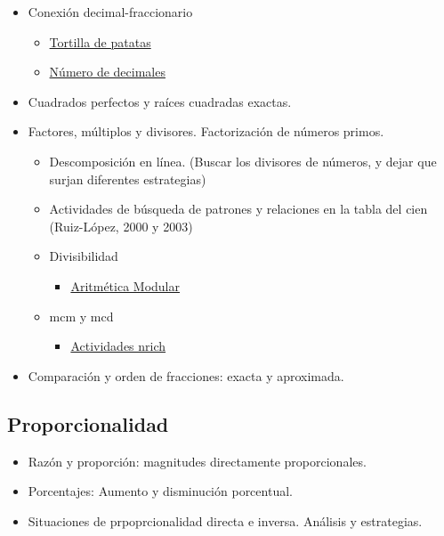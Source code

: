 \begin{itemize}
  \item Conexión decimal-fraccionario
  \begin{itemize}
    \item \href{https://www.tierradenumeros.com/post/hilo-conexion-decimal-fraccion-tortillas-unpacked/}{Tortilla de patatas}
    \item \href{https://twitter.com/smaccarrone/status/1636353759281307649?s=20}{Número de decimales}
  \end{itemize}
  \item Cuadrados perfectos y raíces cuadradas exactas.
  \item Factores, múltiplos y divisores. Factorización de números primos.
  \begin{itemize}
    \item Descomposición en línea. (Buscar los divisores de números, y dejar que surjan diferentes estrategias)
    \item Actividades de búsqueda de patrones y relaciones en la tabla del cien (Ruiz-López, 2000 y 2003)
    \item Divisibilidad
    \begin{itemize}
      \item \href{https://nrich.maths.org/6651}{Aritmética Modular}
    \end{itemize}
    \item mcm y mcd
    \begin{itemize}
      \item \href{https://nrich.maths.org/mobile?utm_source=secondary-map}{Actividades nrich}
    \end{itemize}
  \end{itemize}
  \item Comparación y orden de fracciones: exacta y aproximada.
\end{itemize}

\subsection*{Proporcionalidad}

\begin{itemize}
  \item Razón y proporción: magnitudes directamente proporcionales.
  \item Porcentajes: Aumento y disminución porcentual.
  \item Situaciones de prpoprcionalidad directa e inversa. Análisis y estrategias.
\end{itemize}

